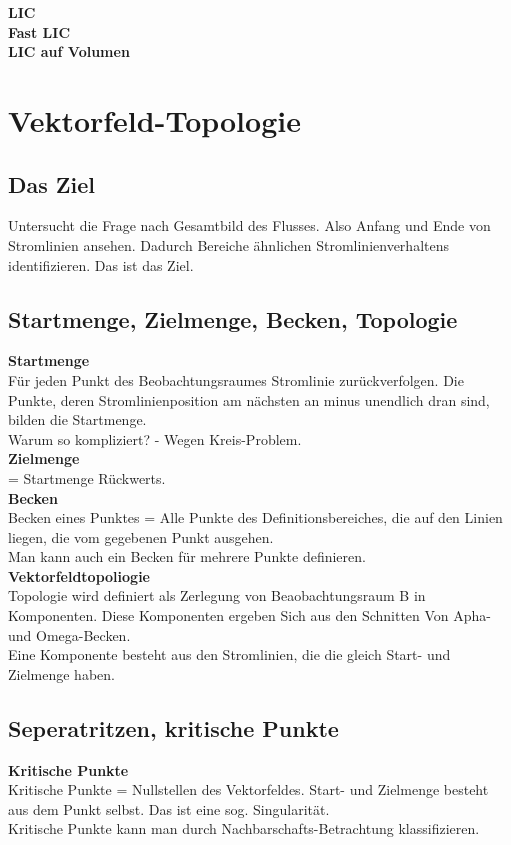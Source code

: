 \documentclass{article}
\begin{document}
\noindent \textbf{LIC}\\

\noindent \textbf{Fast LIC}\\

\noindent \textbf{LIC auf Volumen}

\pagebreak
\section{Vektorfeld-Topologie}

\subsection{Das Ziel}
Untersucht die Frage nach Gesamtbild des Flusses. Also Anfang und Ende von Stromlinien ansehen. Dadurch Bereiche ähnlichen Stromlinienverhaltens identifizieren. Das ist das Ziel.\\

\subsection{Startmenge, Zielmenge, Becken, Topologie}
\noindent \textbf{Startmenge}\\
Für jeden Punkt des Beobachtungsraumes Stromlinie zurückverfolgen. Die Punkte, deren Stromlinienposition am nächsten an minus unendlich dran sind, bilden die Startmenge.\\
Warum so kompliziert? - Wegen Kreis-Problem.\\

\noindent \textbf{Zielmenge}\\
= Startmenge Rückwerts.\\

\noindent \textbf{Becken}\\
Becken eines Punktes = Alle Punkte des Definitionsbereiches, die auf den Linien liegen, die vom gegebenen Punkt ausgehen.\\ 
Man kann auch ein Becken für mehrere Punkte definieren.\\

\noindent \textbf{Vektorfeldtopoliogie}\\
Topologie wird definiert als Zerlegung von Beaobachtungsraum B in Komponenten. Diese Komponenten ergeben Sich aus den Schnitten Von Apha- und Omega-Becken. \\
Eine Komponente besteht aus den Stromlinien, die die gleich Start- und Zielmenge haben.


\subsection{Seperatritzen, kritische Punkte}
\noindent \textbf{Kritische Punkte}\\
Kritische Punkte = Nullstellen des Vektorfeldes. Start- und Zielmenge besteht aus dem Punkt selbst. Das ist eine sog. Singularität.\\
Kritische Punkte kann man durch Nachbarschafts-Betrachtung klassifizieren.\\
\end{document}
